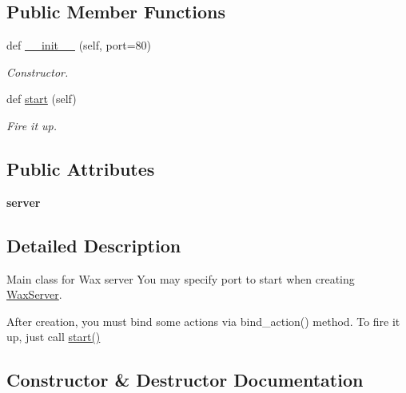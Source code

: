 \subsection*{Public Member Functions}
\begin{DoxyCompactItemize}
\item 
def \hyperlink{classwax_1_1WaxServer_1_1WaxServer_ac24860098a9231745f96d05a90444187}{\+\_\+\+\_\+init\+\_\+\+\_\+} (self, port=80)
\begin{DoxyCompactList}\small\item\em Constructor. \end{DoxyCompactList}\item 
def \hyperlink{classwax_1_1WaxServer_1_1WaxServer_a95283fc6af92b3c7f28facbd9c7e995f}{start} (self)\hypertarget{classwax_1_1WaxServer_1_1WaxServer_a95283fc6af92b3c7f28facbd9c7e995f}{}\label{classwax_1_1WaxServer_1_1WaxServer_a95283fc6af92b3c7f28facbd9c7e995f}

\begin{DoxyCompactList}\small\item\em Fire it up. \end{DoxyCompactList}\end{DoxyCompactItemize}
\subsection*{Public Attributes}
\begin{DoxyCompactItemize}
\item 
{\bfseries server}\hypertarget{classwax_1_1WaxServer_1_1WaxServer_a2a265dc0e14a20b39c3971395fbadaa1}{}\label{classwax_1_1WaxServer_1_1WaxServer_a2a265dc0e14a20b39c3971395fbadaa1}

\end{DoxyCompactItemize}


\subsection{Detailed Description}
Main class for Wax server You may specify port to start when creating \hyperlink{classwax_1_1WaxServer_1_1WaxServer}{Wax\+Server}. 

After creation, you must bind some actions via bind\+\_\+action() method. To fire it up, just call \hyperlink{classwax_1_1WaxServer_1_1WaxServer_a95283fc6af92b3c7f28facbd9c7e995f}{start()} 

\subsection{Constructor \& Destructor Documentation}
